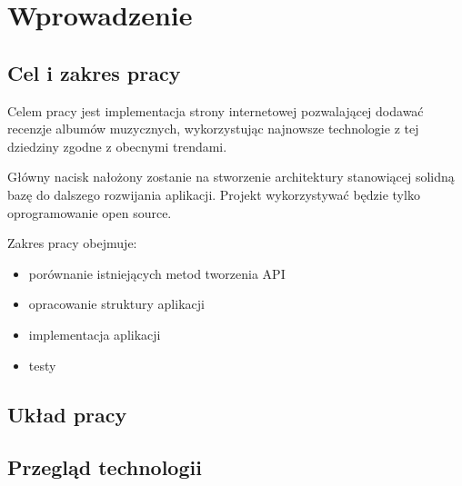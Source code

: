\chapter{Wprowadzenie}
\section{Cel i zakres pracy}
	Celem pracy jest implementacja strony internetowej pozwalającej dodawać recenzje albumów muzycznych,
	wykorzystując najnowsze technologie z tej dziedziny zgodne z obecnymi trendami.

	Główny nacisk nałożony zostanie na stworzenie architektury stanowiącej solidną bazę do dalszego rozwijania aplikacji.
	Projekt wykorzystywać będzie tylko oprogramowanie open source.

	Zakres pracy obejmuje:
	\begin{itemize}
		\item porównanie istniejących metod tworzenia API
		\item opracowanie struktury aplikacji
		\item implementacja aplikacji
		\item testy 
	\end{itemize}
	
\section{Układ pracy}

\section{Przegląd technologii}
